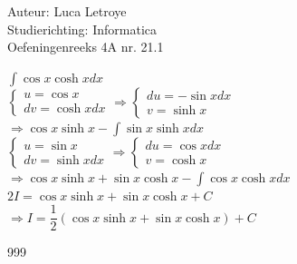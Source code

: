 \documentclass[a4paper]{article}
\begin{document}
  
\noindent \large Auteur: Luca Letroye \\
\noindent \large Studierichting: Informatica\\
\noindent \large Oefeningenreeks 4A nr. 21.1

\medskip
\normalsize

$\displaystyle\int \cos x \cosh x dx$\\

$\left\{
\begin{array}{l}
	u=\cos x \\ 
	dv=\cosh xdx
\end{array}
\right.
\Rightarrow 
\left\{
\begin{array}{l}
	du= 	-\sin xdx\\
 	v= \sinh x
\end{array}
\right.$\\

$\Rightarrow \cos x \sinh x - \displaystyle\int \sin x \sinh xdx$\\

$\left\{
\begin{array}{l}
	u=\sin x \\ 
	dv=\sinh xdx
\end{array}
\right.
\Rightarrow 
\left\{
\begin{array}{l}
	du= 	\cos xdx\\
 	v= \cosh x
\end{array}
\right.$\\

$\Rightarrow \cos x\sinh x + \sin x \cosh x - \displaystyle\int \cos x\cosh x dx$\\

$2I  = \cos x\sinh x + \sin x \cosh x +C $\\

$\Rightarrow I  = \dfrac{1}{2}(\cos x\sinh x + \sin x \cosh x )+C$\\



\begin{thebibliography}{999}
\end{thebibliography}
\end{document}
